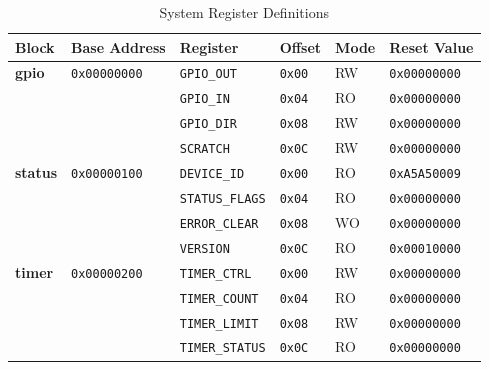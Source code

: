 \documentclass[11pt]{article}
\begin{document}
\begin{table}[h]
\centering
\caption{System Register Definitions}
\begin{tabular}{@{}llllll@{}}
\toprule
\textbf{Block} & \textbf{Base Address} & \textbf{Register} & \textbf{Offset} & \textbf{Mode} & \textbf{Reset Value} \\ \midrule
\textbf{gpio}  & \texttt{0x00000000}    & \texttt{GPIO\_OUT} & \texttt{0x00}   & RW            & \texttt{0x00000000}  \\
               &                        & \texttt{GPIO\_IN}  & \texttt{0x04}   & RO            & \texttt{0x00000000}  \\
               &                        & \texttt{GPIO\_DIR} & \texttt{0x08}   & RW            & \texttt{0x00000000}  \\
               &                        & \texttt{SCRATCH}   & \texttt{0x0C}   & RW            & \texttt{0x00000000}  \\ \midrule
\textbf{status}& \texttt{0x00000100}    & \texttt{DEVICE\_ID}& \texttt{0x00}   & RO            & \texttt{0xA5A50009}  \\
               &                        & \texttt{STATUS\_FLAGS}& \texttt{0x04}& RO            & \texttt{0x00000000}  \\
               &                        & \texttt{ERROR\_CLEAR}& \texttt{0x08} & WO            & \texttt{0x00000000}  \\
               &                        & \texttt{VERSION}   & \texttt{0x0C}   & RO            & \texttt{0x00010000}  \\ \midrule
\textbf{timer} & \texttt{0x00000200}    & \texttt{TIMER\_CTRL}& \texttt{0x00}  & RW            & \texttt{0x00000000}  \\
               &                        & \texttt{TIMER\_COUNT}& \texttt{0x04} & RO            & \texttt{0x00000000}  \\
               &                        & \texttt{TIMER\_LIMIT}& \texttt{0x08} & RW            & \texttt{0x00000000}  \\
               &                        & \texttt{TIMER\_STATUS}& \texttt{0x0C}& RO            & \texttt{0x00000000}  \\ \bottomrule
\end{tabular}
\end{table}
\end{document}
